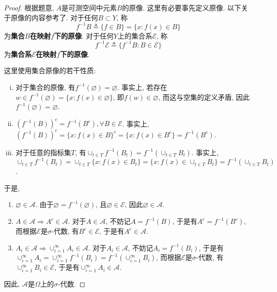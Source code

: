 \documentclass[UTF8, a4paper]{article}
\begin{document}
\begin{proof}
根据题意, \({A}\)是可测空间中元素\(B\)的原像. 
这里有必要事先定义原像. 以下关于原像的内容参考了\cite{prob}.
对于任何\(B \subset Y\), 称 
$$
f^{-1}B \triangleq \{f\in B\} = \{x: f(x) \in B\}
$$
为{\bf 集合\(B\)在映射\(f\)下的原像}.
对于任何\(Y\)上的集合系\(\mathcal{E}\), 称
$$
f^{-1} \mathcal{E} \triangleq \{f^{-1}B: B \in \mathcal{E}\}
$$
为{\bf 集合系\(\mathcal{E}\)在映射\(f\)下的原像}.

这里使用集合原像的若干性质:
\begin{enumerate}[(i)]
    \item 对于集合的原像, 有\(f^{-1}(\varnothing) = \varnothing\).
    事实上, 若存在\(w\in f^{-1}(\varnothing) = \{x: f(x) \in \varnothing\}\), 即\(f(w) \in \varnothing\), 而这与空集的定义矛盾, 因此\(f^{-1}(\varnothing) = \varnothing\).
    \item \(\left(f^{-1}(B)\right)^c = f^{-1}(B^c), \forall B \in \mathcal{E}\). 事实上, \(\left(f^{-1}(B)\right)^c = \{x: f(x) \in B\}^c = \{x: f(x) \in B^c\} = f^{-1}(B^c)\).
    \item 对于任意的指标集\(T\), 有\(\cup_{t\in T} f^{-1}(B_t) = f^{-1}\left(\cup_{t\in T} B_t\right)\). 事实上, \(\cup_{t\in T} f^{-1}(B_t) = \cup_{t\in T} \{x:f(x) \in B_t\} = \{x: f(x) \in \cup_{t\in T} B_t\} = f^{-1}\left(\cup_{t\in T} B_t\right)\).
\end{enumerate}



于是, 
\begin{enumerate}
    \item \(\varnothing \in \mathcal{A}\). 由于\(\varnothing = f^{-1}(\varnothing)\), 且\(\varnothing \in \mathcal{E}\), 因此\(\varnothing \in \mathcal{A}\).
    \item \(A \in \mathcal{A} \Rightarrow A^c \in \mathcal{A}\). 对于\(A \in \mathcal{A}\), 不妨记\(A = f^{-1}(B)\), 于是有\(A^c = f^{-1}(B^c)\), 而根据\(\mathcal{E}\)是\(\sigma\)-代数, 有\(B^c \in \mathcal{E}\), 于是有\(A^c \in \mathcal{A}\).
    \item \(A_i \in \mathcal{A} \Rightarrow \cup_{i=1}^\infty A_i \in \mathcal{A}\). 对于\(A_i \in \mathcal{A}\), 不妨记\(A_i = f^{-1}(B_i)\), 于是有\(\cup_{i=1}^\infty A_i = \cup_{i=1}^\infty f^{-1}(B_i) = f^{-1}(\cup_{i=1}^\infty B_i)\), 而根据\(\mathcal{E}\)是\(\sigma\)-代数, 有\(\cup_{i=1}^\infty B_i \in \mathcal{E}\), 于是有\(\cup_{i=1}^\infty A_i \in \mathcal{A}\).
\end{enumerate}
因此, \(\mathcal{A}\)是\(\Omega\)上的\(\sigma\)-代数.
\end{proof}
\end{document}

